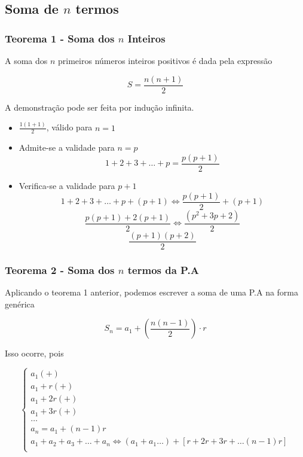 \documentclass[11pt]{article}
\begin{document}
\subsection{Soma de $n$ termos}

\subsubsection{Teorema 1 - Soma dos $n$ Inteiros}
A soma dos $n$ primeiros números inteiros positivos é dada pela expressão

\begin{tcolorbox}[colback=LightBlue]
\[S = \frac{n(n + 1)}{2}\]
\end{tcolorbox}

A demonstração pode ser feita por indução infinita.

\begin{tcolorbox}[colback=LightYellow]
\begin{itemize}
  \item $\frac{1(1 + 1)}{2}$, válido para $n = 1$
  \item Admite-se a validade para $n = p$
        \[1 + 2 + 3 + \dots + p = \frac{p(p + 1)}{2}\]
  \item Verifica-se a validade para $p + 1$
        \[1 + 2 + 3 + \dots + p + (p + 1) \Leftrightarrow \frac{p(p + 1)}{2} + (p + 1)\]
        \[\frac{p(p + 1) + 2(p + 1)}{2} \Leftrightarrow \frac{(p^{2} + 3p + 2)}{2}\]
        \[\frac{(p + 1)(p + 2)}{2}\]
\end{itemize}
\end{tcolorbox}

\subsubsection{Teorema 2 - Soma dos $n$ termos da P.A}

Aplicando o teorema 1 anterior, podemos escrever a soma de uma P.A na forma genérica

\begin{tcolorbox}[colback=LightBlue]
\[S_{n} = a_{1} + \left(\frac{n(n - 1)}{2}\right)\cdot r\]
\end{tcolorbox}

Isso ocorre, pois

\begin{tcolorbox}[colback=LightGreen]
\begin{equation*}
\begin{cases}
  a_{1} (+) \\
  a_{1} + r (+) \\
  a_{1} + 2r (+) \\
  a_{1} + 3r (+) \\
  \dots \\
  a_{n} = a_{1} + (n - 1)r \\
  \hline
  a_{1} + a_{2} + a_{3} + \dots + a_{n} \Leftrightarrow (a_{1} + a_{1} \dots) + [r + 2r + 3r + \dots (n - 1)r]\\
\end{cases}
\end{equation*}
\end{tcolorbox}
\end{document}
